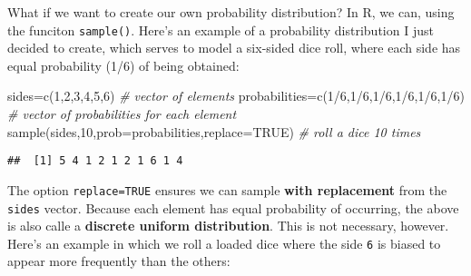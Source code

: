 \documentclass[
]{book}
\newenvironment{Shaded}{\begin{snugshade}}{\end{snugshade}}
\newcommand{\AttributeTok}[1]{\textcolor[rgb]{0.77,0.63,0.00}{#1}}
\newcommand{\CommentTok}[1]{\textcolor[rgb]{0.56,0.35,0.01}{\textit{#1}}}
\newcommand{\ConstantTok}[1]{\textcolor[rgb]{0.00,0.00,0.00}{#1}}
\newcommand{\DecValTok}[1]{\textcolor[rgb]{0.00,0.00,0.81}{#1}}
\newcommand{\FunctionTok}[1]{\textcolor[rgb]{0.00,0.00,0.00}{#1}}
\newcommand{\NormalTok}[1]{#1}
\newcommand{\OtherTok}[1]{\textcolor[rgb]{0.56,0.35,0.01}{#1}}
\newcommand{\SpecialCharTok}[1]{\textcolor[rgb]{0.00,0.00,0.00}{#1}}
\begin{document}
What if we want to create our own probability distribution? In R, we can, using the funciton \texttt{sample()}. Here's an example of a probability distribution I just decided to create, which serves to model a six-sided dice roll, where each side has equal probability (1/6) of being obtained:

\begin{Shaded}
\begin{Highlighting}[]
\NormalTok{sides}\OtherTok{=}\FunctionTok{c}\NormalTok{(}\DecValTok{1}\NormalTok{,}\DecValTok{2}\NormalTok{,}\DecValTok{3}\NormalTok{,}\DecValTok{4}\NormalTok{,}\DecValTok{5}\NormalTok{,}\DecValTok{6}\NormalTok{) }\CommentTok{\# vector of elements}
\NormalTok{probabilities}\OtherTok{=}\FunctionTok{c}\NormalTok{(}\DecValTok{1}\SpecialCharTok{/}\DecValTok{6}\NormalTok{,}\DecValTok{1}\SpecialCharTok{/}\DecValTok{6}\NormalTok{,}\DecValTok{1}\SpecialCharTok{/}\DecValTok{6}\NormalTok{,}\DecValTok{1}\SpecialCharTok{/}\DecValTok{6}\NormalTok{,}\DecValTok{1}\SpecialCharTok{/}\DecValTok{6}\NormalTok{,}\DecValTok{1}\SpecialCharTok{/}\DecValTok{6}\NormalTok{) }\CommentTok{\# vector of probabilities for each element}
\FunctionTok{sample}\NormalTok{(sides,}\DecValTok{10}\NormalTok{,}\AttributeTok{prob=}\NormalTok{probabilities,}\AttributeTok{replace=}\ConstantTok{TRUE}\NormalTok{) }\CommentTok{\# roll a dice 10 times}
\end{Highlighting}
\end{Shaded}

\begin{verbatim}
##  [1] 5 4 1 2 1 2 1 6 1 4
\end{verbatim}

The option \texttt{replace=TRUE} ensures we can sample \textbf{with replacement} from the \texttt{sides} vector. Because each element has equal probability of occurring, the above is also calle a \textbf{discrete uniform distribution}. This is not necessary, however. Here's an example in which we roll a loaded dice where the side \texttt{6} is biased to appear more frequently than the others:
\end{document}
